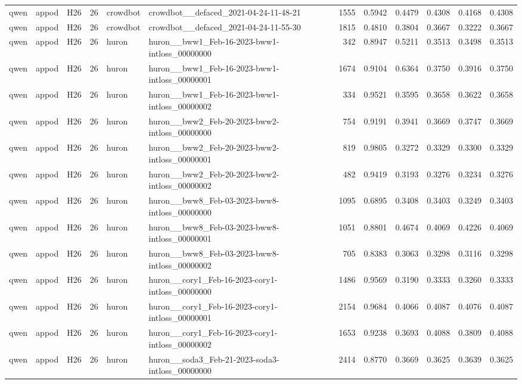 \begin{table}[tbp]
\begin{tabular}{lllrllrrrrrr}
qwen & appod & H26 & 26 & crowdbot & crowdbot\_\_defaced\_2021-04-24-11-48-21 & 1555 & 0.5942 & 0.4479 & 0.4308 & 0.4168 & 0.4308 \\
qwen & appod & H26 & 26 & crowdbot & crowdbot\_\_defaced\_2021-04-24-11-55-30 & 1815 & 0.4810 & 0.3804 & 0.3667 & 0.3222 & 0.3667 \\
qwen & appod & H26 & 26 & huron & huron\_\_bww1\_Feb-16-2023-bww1-intloss\_00000000 & 342 & 0.8947 & 0.5211 & 0.3513 & 0.3498 & 0.3513 \\
qwen & appod & H26 & 26 & huron & huron\_\_bww1\_Feb-16-2023-bww1-intloss\_00000001 & 1674 & 0.9104 & 0.6364 & 0.3750 & 0.3916 & 0.3750 \\
qwen & appod & H26 & 26 & huron & huron\_\_bww1\_Feb-16-2023-bww1-intloss\_00000002 & 334 & 0.9521 & 0.3595 & 0.3658 & 0.3622 & 0.3658 \\
qwen & appod & H26 & 26 & huron & huron\_\_bww2\_Feb-20-2023-bww2-intloss\_00000000 & 754 & 0.9191 & 0.3941 & 0.3669 & 0.3747 & 0.3669 \\
qwen & appod & H26 & 26 & huron & huron\_\_bww2\_Feb-20-2023-bww2-intloss\_00000001 & 819 & 0.9805 & 0.3272 & 0.3329 & 0.3300 & 0.3329 \\
qwen & appod & H26 & 26 & huron & huron\_\_bww2\_Feb-20-2023-bww2-intloss\_00000002 & 482 & 0.9419 & 0.3193 & 0.3276 & 0.3234 & 0.3276 \\
qwen & appod & H26 & 26 & huron & huron\_\_bww8\_Feb-03-2023-bww8-intloss\_00000000 & 1095 & 0.6895 & 0.3408 & 0.3403 & 0.3249 & 0.3403 \\
qwen & appod & H26 & 26 & huron & huron\_\_bww8\_Feb-03-2023-bww8-intloss\_00000001 & 1051 & 0.8801 & 0.4674 & 0.4069 & 0.4226 & 0.4069 \\
qwen & appod & H26 & 26 & huron & huron\_\_bww8\_Feb-03-2023-bww8-intloss\_00000002 & 705 & 0.8383 & 0.3063 & 0.3298 & 0.3116 & 0.3298 \\
qwen & appod & H26 & 26 & huron & huron\_\_cory1\_Feb-16-2023-cory1-intloss\_00000000 & 1486 & 0.9569 & 0.3190 & 0.3333 & 0.3260 & 0.3333 \\
qwen & appod & H26 & 26 & huron & huron\_\_cory1\_Feb-16-2023-cory1-intloss\_00000001 & 2154 & 0.9684 & 0.4066 & 0.4087 & 0.4076 & 0.4087 \\
qwen & appod & H26 & 26 & huron & huron\_\_cory1\_Feb-16-2023-cory1-intloss\_00000002 & 1653 & 0.9238 & 0.3693 & 0.4088 & 0.3809 & 0.4088 \\
qwen & appod & H26 & 26 & huron & huron\_\_soda3\_Feb-21-2023-soda3-intloss\_00000000 & 2414 & 0.8770 & 0.3669 & 0.3625 & 0.3639 & 0.3625 \\

\end{tabular}
\end{table}
